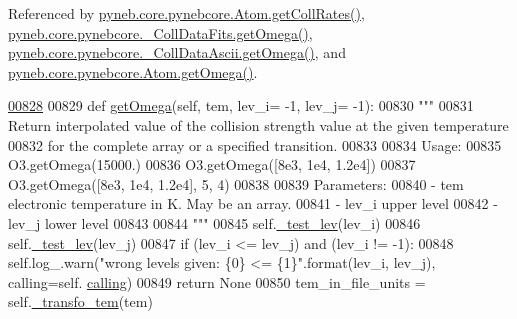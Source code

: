Referenced by \hyperlink{pynebcore_8py_source_l01394}{pyneb.\-core.\-pynebcore.\-Atom.\-get\-Coll\-Rates()}, \hyperlink{pynebcore_8py_source_l00828}{pyneb.\-core.\-pynebcore.\-\_\-\-Coll\-Data\-Fits.\-get\-Omega()}, \hyperlink{pynebcore_8py_source_l01082}{pyneb.\-core.\-pynebcore.\-\_\-\-Coll\-Data\-Ascii.\-get\-Omega()}, and \hyperlink{pynebcore_8py_source_l01324}{pyneb.\-core.\-pynebcore.\-Atom.\-get\-Omega()}.


\begin{DoxyCode}
\hypertarget{classpyneb_1_1core_1_1pynebcore_1_1___coll_data_fits_l00828}{}\hyperlink{classpyneb_1_1core_1_1pynebcore_1_1___coll_data_fits_a07beca7cf9ee37f231754f0458fb8c2f}{00828} 
00829     \textcolor{keyword}{def }\hyperlink{classpyneb_1_1core_1_1pynebcore_1_1___coll_data_fits_a07beca7cf9ee37f231754f0458fb8c2f}{getOmega}(self, tem, lev\_i= -1, lev\_j= -1):
00830         \textcolor{stringliteral}{"""}
00831 \textcolor{stringliteral}{        Return interpolated value of the collision strength value at the given temperature }
00832 \textcolor{stringliteral}{            for the complete array or a specified transition.}
00833 \textcolor{stringliteral}{}
00834 \textcolor{stringliteral}{        Usage:}
00835 \textcolor{stringliteral}{            O3.getOmega(15000.)}
00836 \textcolor{stringliteral}{            O3.getOmega([8e3, 1e4, 1.2e4])}
00837 \textcolor{stringliteral}{            O3.getOmega([8e3, 1e4, 1.2e4], 5, 4)}
00838 \textcolor{stringliteral}{        }
00839 \textcolor{stringliteral}{        Parameters:}
00840 \textcolor{stringliteral}{            - tem    electronic temperature in K. May be an array.}
00841 \textcolor{stringliteral}{            - lev\_i  upper level}
00842 \textcolor{stringliteral}{            - lev\_j  lower level}
00843 \textcolor{stringliteral}{}
00844 \textcolor{stringliteral}{        """}
00845         self.\hyperlink{classpyneb_1_1core_1_1pynebcore_1_1___coll_data_fits_a0654555565cc60412d6f639a9a3289ff}{\_test\_lev}(lev\_i)
00846         self.\hyperlink{classpyneb_1_1core_1_1pynebcore_1_1___coll_data_fits_a0654555565cc60412d6f639a9a3289ff}{\_test\_lev}(lev\_j)
00847         \textcolor{keywordflow}{if} (lev\_i <= lev\_j) \textcolor{keywordflow}{and} (lev\_i != -1):
00848             self.log\_.warn(\textcolor{stringliteral}{"wrong levels given: \{0\} <= \{1\}"}.format(lev\_i, lev\_j), calling=self.
      \hyperlink{classpyneb_1_1core_1_1pynebcore_1_1___coll_data_fits_a43c9d096f9508cb475cb4fc3552e1979}{calling})
00849             \textcolor{keywordflow}{return} \textcolor{keywordtype}{None}            
00850         tem\_in\_file\_units = self.\hyperlink{classpyneb_1_1core_1_1pynebcore_1_1___coll_data_fits_afa9318fd2557709e968682f47cefa379}{\_transfo\_tem}(tem)

\end{DoxyCode}
